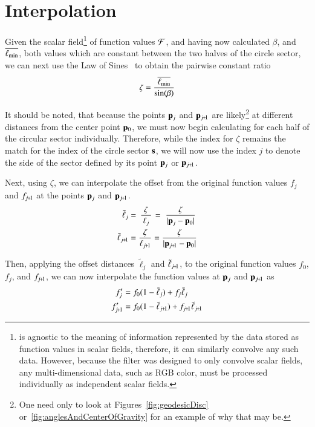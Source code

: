 \section{Interpolation}
\label{ch4sI}
Given the scalar field\footnote{ is agnostic to the meaning of information represented by the data stored as function values in scalar fields, therefore, it can similarly convolve any such data. However, because the filter was designed to only convolve scalar fields, any multi-dimensional data, such as RGB color, must be processed individually as independent scalar fields.} of function values $\mathcal{F}$, and having now calculated $\beta$, and $\overline{\ell_\text{min}}$, both values which are constant between the two halves of the circle sector, we can next use the Law of Sines~\cite{Weisstein19g} to obtain the pairwise constant ratio
%
\begin{equation}
	\zeta = \frac{\overline{\ell_\text{min}}}{\sin(\beta)}
	\label{eq:zeta}
\end{equation}%
%

It should be noted, that because the points $\mathbf{p}_j$ and $\bp_{\sjpo}$ are likely\footnote{One need only to look at Figures~\ref{fig:geodesicDisc} or~\ref{fig:anglesAndCenterOfGravity} for an example of why that may be.} at different distances from the center point $\mathbf{p}_0$, we must now begin calculating for each half of the circular sector individually. Therefore, while the index for $\zeta$ remains the match for the index of the circle sector $\mathbf{s}$, we will now use the index $j$ to denote the side of the sector defined by its point $\mathbf{p}_j$ or $\bp_{\sjpo}$.

Next, using $\zeta$, we can interpolate the offset from the original function values $f_j$ and $f_{\sjpo}$ at the points $\mathbf{p}_j$ and $\bp_{\sjpo}$.
\begin{align}
	\tilde{\ell}_j & = \kern2pt\frac{\zeta}{\kern2pt\ell_j\kern2pt}\kern1pt = \kern3pt\frac{\zeta}{|\bp_j - \bp_0|}
	\label{eq:distanceIForInterpolation}\\
	\tilde{\ell}_{\sjpo} & = \frac{\zeta}{\ell_{\sjpo}} = \frac{\zeta}{|\bp_{\sjpo} - \bp_0|}
	\label{eq:distanceIp1ForInterpolation}
\end{align}%
%

Then, applying the offset distances $\tilde{\ell}_j$ and $\tilde{\ell}_{\sjpo}$, to the original function values $f_0$, $f_j$, and $f_{\sjpo}$, we can now interpolate the function values at $\mathbf{p}_j$ and $\bp_{\sjpo}$ as
\begin{align}
	f'_j & = f_0(1 - \tilde{\ell}_j) + f_j\tilde{\ell}_j
	\label{eq:interpolatedFi} \\
	f'_{\sjpo} & = f_0(1 - \tilde{\ell}_{\sjpo}) + f_{\sjpo}\tilde{\ell}_{\sjpo}
	\label{eq:interpolatedFip1}
\end{align}%
%

